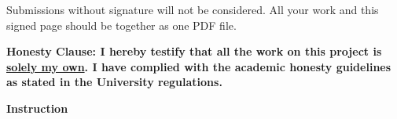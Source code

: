 %
%
%
\ifx\undefined\sol
Submissions without signature will not be considered. All your work and this signed page should be together as one PDF file.
\vspace{3em}
\else
{ \large
\textbf{Honesty Clause: {\color{red}I hereby testify that all the work on this project is \underline{solely my own}. I have complied with the academic honesty guidelines as stated in the University regulations.}}


\begin{Form}
\end{Form}
\begin{Form}
\end{Form}
}
\vspace{5em}
\fi

\textbf{Instruction}

